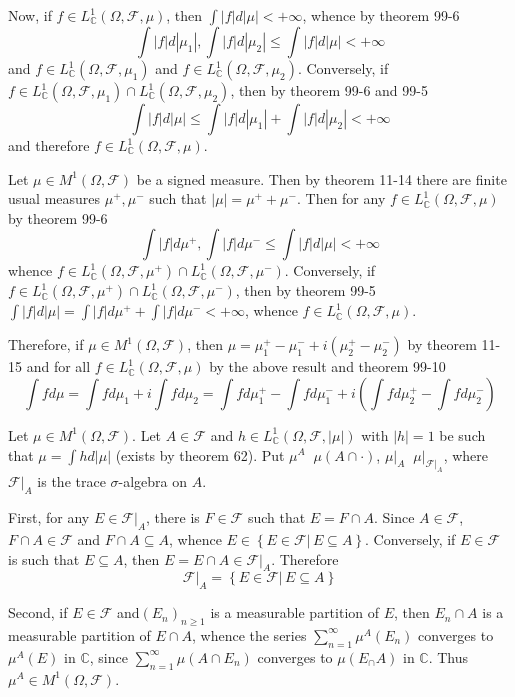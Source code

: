 \documentclass[a4paper]{article}
\newcommand{\obj}[1]{\left\{ #1 \right \}}
\newcommand{\brac}[1]{\left ( #1 \right )}
\newcommand{\induc}[1]{\left . #1 \right \vert}
\newcommand{\abs}[1]{\left | #1 \right |}
\newcommand{\Cplx}{\mathbb{C}}
\newcommand{\Fcal}{\mathcal{F}}
\newcommand{\defn}{\mathop{\overset{\Delta}{=}}\nolimits}
\begin{document}
Now, if $f\in L^1_\Cplx\brac{\Omega, \Fcal, \mu}$, then $\int \abs{f} d\abs{\mu}<+\infty$, whence by theorem 99-6 \[\int \abs{f} d\abs{\mu_1},\int \abs{f} d\abs{\mu_2}\leq \int \abs{f} d\abs{\mu}<+\infty\] and $f\in L^1_\Cplx\brac{\Omega, \Fcal, \mu_1}$ and $f\in L^1_\Cplx\brac{\Omega, \Fcal, \mu_2}$. Conversely, if $f\in L^1_\Cplx\brac{\Omega, \Fcal, \mu_1} \cap L^1_\Cplx\brac{\Omega, \Fcal, \mu_2}$, then by theorem 99-6 and 99-5 \[\int \abs{f} d\abs{\mu}\leq \int \abs{f} d\abs{\mu_1}+\int \abs{f} d\abs{\mu_2}<+\infty\] and therefore $f\in L^1_\Cplx\brac{\Omega, \Fcal, \mu}$.

Let $\mu\in M^1\brac{\Omega, \Fcal}$ be a signed measure. Then by theorem 11-14 there are finite usual measures $\mu^+, \mu^-$ such that $\abs{\mu} = \mu^+ + \mu^-$. Then for any $f\in L^1_\Cplx\brac{\Omega, \Fcal, \mu}$ by theorem 99-6 \[\int \abs{f} d\mu^+, \int \abs{f} d\mu^- \leq \int \abs{f} d\abs{\mu} <+\infty\] whence $f\in L^1_\Cplx\brac{\Omega, \Fcal, \mu^+}\cap L^1_\Cplx\brac{\Omega, \Fcal, \mu^-}$. Conversely, if $f\in L^1_\Cplx\brac{\Omega, \Fcal, \mu^+}\cap L^1_\Cplx\brac{\Omega, \Fcal, \mu^-}$, then by theorem 99-5 $\int \abs{f} d\abs{\mu} = \int \abs{f} d\mu^+ + \int \abs{f} d\mu^- < +\infty$, whence $f\in L^1_\Cplx\brac{\Omega, \Fcal, \mu}$.

Therefore, if $\mu\in M^1\brac{\Omega, \Fcal}$, then $\mu = \mu_1^+ - \mu_1^- + i \brac{ \mu_2^+ - \mu_2^- }$ by theorem 11-15 and for all $f\in L^1_\Cplx\brac{\Omega, \Fcal, \mu}$ by the above result and theorem 99-10 \[\int f d\mu = \int f d\mu_1 + i \int f d\mu_2 = \int f d\mu_1^+ - \int f d\mu_1^- + i \brac{\int f d\mu_2^+ - \int f d\mu_2^- }\]

Let $\mu \in M^1\brac{\Omega, \Fcal}$. Let $A\in \Fcal$ and $h\in L^1_\Cplx\brac{\Omega, \Fcal, \abs{\mu}}$ with $\abs{h}=1$ be such that $\mu=\int h d\abs{\mu}$ (exists by theorem 62). Put $\mu^A\defn \mu\brac{A\cap\cdot}$, $\induc{\mu}_A\defn \induc{\mu}_{\induc{\Fcal}_A}$, where $\induc{\Fcal}_A$ is the trace $\sigma$-algebra on $A$.

First, for any $E\in \induc{\Fcal}_A$, there is $F\in \Fcal$ such that $E=F\cap A$. Since $A\in \Fcal$, $F\cap A\in \Fcal$ and $F\cap A\subseteq A$, whence $E\in \obj{\induc{E\in \Fcal}\, E\subseteq A}$. Conversely, if $E\in \Fcal$ is such that $E\subseteq A$, then $E=E\cap A\in \induc{\Fcal}_A$. Therefore \[\induc{\Fcal}_A = \obj{ \induc{E\in \Fcal}\, E\subseteq A }\]

Second, if $E\in\Fcal$ and$\brac{E_n}_{n\geq1}$ is a measurable partition of $E$, then $E_n\cap A$ is a measurable partition of $E\cap A$, whence the series $\sum_{n=1}^\infty \mu^A\brac{E_n}$ converges to $\mu^A\brac{E}$ in $\Cplx$, since $\sum_{n=1}^\infty \mu\brac{A\cap E_n}$ converges to $\mu\brac{E_\cap A}$ in $\Cplx$. Thus $\mu^A\in M^1\brac{\Omega, \Fcal}$.
\end{document}

